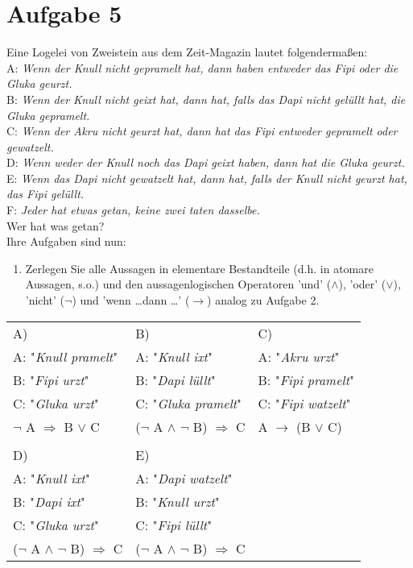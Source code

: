 \section*{Aufgabe 5}

Eine Logelei von Zweistein aus dem Zeit-Magazin lautet folgendermaßen:\\

A: \textit{Wenn der Knull nicht gepramelt hat, dann haben entweder das Fipi oder die Gluka geurzt.}\\

B: \textit{Wenn der Knull nicht geixt hat, dann hat, falls das Dapi nicht gelüllt hat, die Gluka gepramelt.}\\

C: \textit{Wenn der Akru nicht geurzt hat, dann hat das Fipi entweder gepramelt oder gewatzelt.}\\

D: \textit{Wenn weder der Knull noch das Dapi geixt haben, dann hat die Gluka geurzt.}\\

E: \textit{Wenn das Dapi nicht gewatzelt hat, dann hat, falls der Knull nicht geurzt hat, das Fipi gelüllt.}\\

F: \textit{Jeder hat etwas getan, keine zwei taten dasselbe.}\\

Wer hat was getan?\\

Ihre Aufgaben sind nun:

\begin{enumerate}[label={a)}, leftmargin=*]
    \item Zerlegen Sie alle Aussagen in elementare Bestandteile (d.h. in atomare Aussagen, s.o.) und den aussagenlogischen Operatoren 'und' ($\land$), 'oder' ($\lor$), 'nicht' ($\neg$) und 'wenn \dots dann \dots ' ($\rightarrow$) analog zu Aufgabe 2.
\end{enumerate}

\begin{tabularx}{\textwidth}{XXX}
A) & B) & C)\\
A: "\textit{Knull pramelt}" & A: "\textit{Knull ixt}" & A: "\textit{Akru urzt}"\\
B: "\textit{Fipi urzt}" & B: "\textit{Dapi lüllt}" & B: "\textit{Fipi pramelt}"\\
C: "\textit{Gluka urzt}" & C: "\textit{Gluka pramelt}" & C: "\textit{Fipi watzelt}"\\
$\neg$ A $\Rightarrow$ B $\lor$ C & ($\neg$ A $\land$ $\neg$ B) $\Rightarrow$ C & A $\rightarrow$ (B $\lor$ C)\\
& &\\
D) & E) &\\
A: "\textit{Knull ixt}" & A: "\textit{Dapi watzelt}" &\\
B: "\textit{Dapi ixt}" & B: "\textit{Knull urzt}" &\\
C: "\textit{Gluka urzt}" & C: "\textit{Fipi lüllt}"& \\
($\neg$ A $\land$ $\neg$ B) $\Rightarrow$ C & ($\neg$ A $\land$ $\neg$ B) $\Rightarrow$ C &
\end{tabularx}

